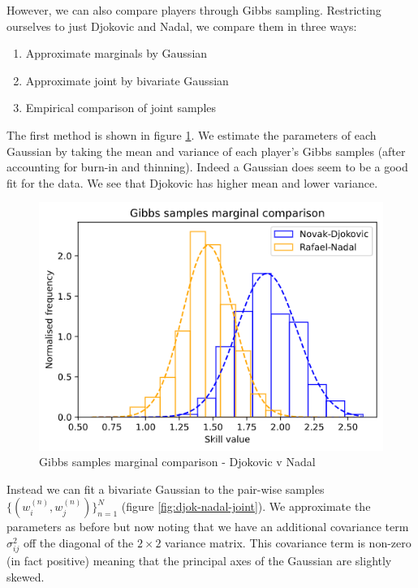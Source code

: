 \documentclass[]{article}
\newcommand{\figwidth}{0.6\linewidth}
\begin{document}
However, we can also compare players through Gibbs sampling. Restricting ourselves to just Djokovic and Nadal, we compare them in three ways:

\begin{enumerate}
	\item Approximate marginals by Gaussian
	\item Approximate joint by bivariate Gaussian
	\item Empirical comparison of joint samples
\end{enumerate}

The first method is shown in figure \ref{fig:djok-nadal-marginal}. We estimate the parameters of each Gaussian by taking the mean and variance of each player's Gibbs samples (after accounting for burn-in and thinning). Indeed a Gaussian does seem to be a good fit for the data. We see that Djokovic has higher mean and lower variance.

\begin{figure}[!h]
	\centering
	\includegraphics[width=\figwidth]{djokovic-nadal-marginal.png}
	\caption{Gibbs samples marginal comparison - Djokovic v Nadal}
	\label{fig:djok-nadal-marginal}
\end{figure}

Instead we can fit a bivariate Gaussian to the pair-wise samples $\{(w_i^{(n)}, w_j^{(n)})\}_{n=1}^{N}$ (figure \ref{fig:djok-nadal-joint}). We approximate the parameters as before but now noting that we have an additional covariance term $\sigma_{ij}^2$ off the diagonal of the $2 \times 2$ variance matrix. This covariance term is non-zero (in fact positive) meaning that the principal axes of the Gaussian are slightly skewed.
\end{document}
